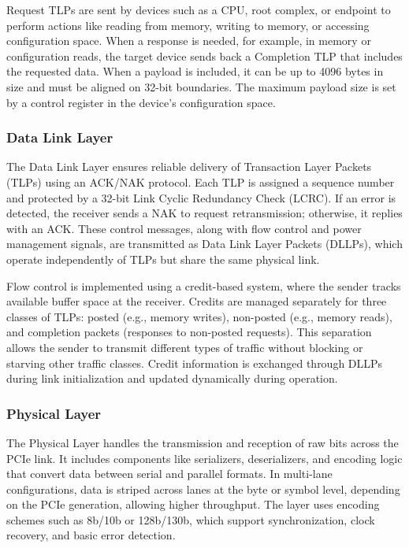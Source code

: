 Request TLPs are sent by devices such as a CPU, root complex, or endpoint to perform actions like reading from memory, writing to memory, or accessing configuration space. When a response is needed, for example, in memory or configuration reads, the target device sends back a Completion TLP that includes the requested data. When a payload is included, it can be up to 4096 bytes in size and must be aligned on 32-bit boundaries. The maximum payload size is set by a control register in the device's configuration space. 

\subsubsection{Data Link Layer}

The Data Link Layer ensures reliable delivery of Transaction Layer Packets (TLPs) using an ACK/NAK protocol. Each TLP is assigned a sequence number and protected by a 32-bit Link Cyclic Redundancy Check (LCRC). If an error is detected, the receiver sends a NAK to request retransmission; otherwise, it replies with an ACK. These control messages, along with flow control and power management signals, are transmitted as Data Link Layer Packets (DLLPs), which operate independently of TLPs but share the same physical link.

Flow control is implemented using a credit-based system, where the sender tracks available buffer space at the receiver. Credits are managed separately for three classes of TLPs: posted (e.g., memory writes), non-posted (e.g., memory reads), and completion packets (responses to non-posted requests). This separation allows the sender to transmit different types of traffic without blocking or starving other traffic classes. Credit information is exchanged through DLLPs during link initialization and updated dynamically during operation.

\subsubsection{Physical Layer}

The Physical Layer handles the transmission and reception of raw bits across the PCIe link. It includes components like serializers, deserializers, and encoding logic that convert data between serial and parallel formats. In multi-lane configurations, data is striped across lanes at the byte or symbol level, depending on the PCIe generation, allowing higher throughput. The layer uses encoding schemes such as 8b/10b or 128b/130b, which support synchronization, clock recovery, and basic error detection.


